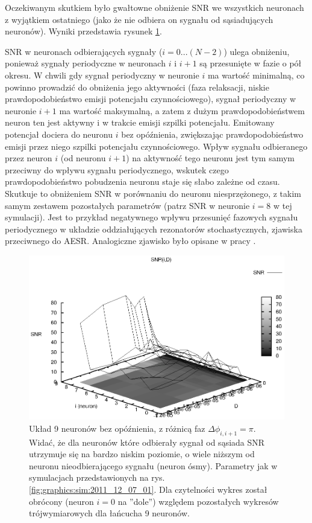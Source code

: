  Oczekiwanym skutkiem było gwałtowne obniżenie SNR we wszystkich neuronach z wyjątkiem ostatniego (jako że nie odbiera on sygnału od sąsiadujących neuronów). Wyniki przedstawia rysunek \ref{fig:graphics:sim:2011_12_06_01}.

  SNR w neuronach odbierających sygnały ($i=0...(N-2)$) ulega obniżeniu, ponieważ sygnały periodyczne w neuronach $i$ i $i+1$ są przesunięte w fazie o pół okresu. W chwili gdy sygnał periodyczny w neuronie $i$ ma wartość minimalną, co powinno prowadzić do obniżenia jego aktywności (faza relaksacji, niskie prawdopodobieństwo emisji potencjału czynnościowego), sygnał periodyczny w neuronie $i+1$ ma wartość maksymalną, a zatem z dużym prawdopodobieństwem neuron ten jest aktywny i w trakcie emisji szpilki potencjału. Emitowany potencjał dociera do neuronu $i$ bez opóźnienia, zwiększając prawdopodobieństwo emisji przez niego szpilki potencjału czynnościowego. Wpływ sygnału odbieranego przez neuron $i$ (od neuronu $i+1$) na aktywność tego neuronu jest tym samym przeciwny do wpływu sygnału periodycznego, wskutek czego prawdopodobieństwo pobudzenia neuronu staje się słabo zależne od czasu. Skutkuje to obniżeniem SNR w porównaniu do neuronu niesprzężonego, z takim samym zestawem pozostałych parametrów (patrz SNR w neuronie $i=8$ w tej symulacji).
  Jest to przykład negatywnego wpływu przesunięć fazowych sygnału periodycznego w układzie oddziałujących rezonatorów stochastycznych, zjawiska przeciwnego do AESR. Analogiczne zjawisko było opisane w pracy \cite{ijmpb_14_8}.

  \begin{figure}
    \includegraphics[width=140mm]{images/9neuron/2011_12_06_01}
    \caption{Układ 9 neuronów bez opóźnienia, z różnicą faz $\Delta \phi_{i,i+1} = \pi $. Widać, że dla neuronów które odbierały sygnał od sąsiada SNR utrzymuje się na bardzo niskim poziomie, o wiele niższym od neuronu nieodbierającego sygnału (neuron ósmy). Parametry jak w symulacjach przedstawionych na rys. \ref{fig:graphics:sim:2011_12_07_01}. Dla czytelności wykres został obrócony (neuron $i=0$ na ''dole'') względem pozostałych wykresów trójwymiarowych dla łańcucha 9 neuronów.}
    \label{fig:graphics:sim:2011_12_06_01}
  \end{figure}


